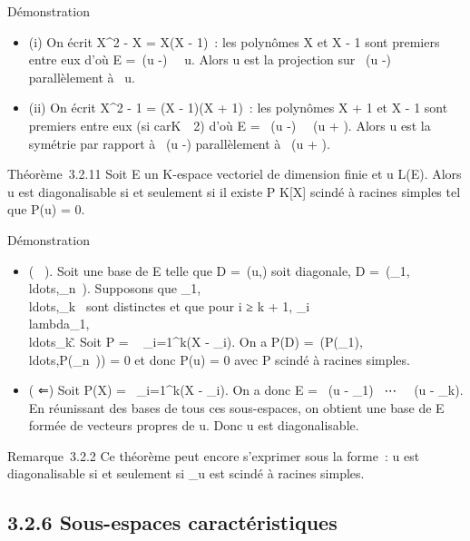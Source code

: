 \documentclass[]{article}
\begin{document}
Démonstration

\begin{itemize}
\itemsep1pt\parskip0pt
\item
  (i) On écrit X^2 - X = X(X - 1)~: les polynômes X et X - 1
  sont premiers entre eux d'où E =\
  \mathrmKer(u -\mathrmId)
  \oplus~\mathrmKer~u. Alors u est
  la projection sur
  \mathrmKer~(u
  -\mathrmId) parallèlement à
  \mathrmKer~u.
\item
  (ii) On écrit X^2 - 1 = (X - 1)(X + 1)~: les polynômes X +
  1 et X - 1 sont premiers entre eux (si
  carK\mathrel\neq~~2) d'où E
  = \mathrmKer~(u
  -\mathrmId)
  \oplus~\mathrmKer~(u +
  \mathrmId). Alors u est la symétrie par rapport à
  \mathrmKer~(u
  -\mathrmId) parallèlement à
  \mathrmKer~(u +
  \mathrmId).
\end{itemize}

Théorème~3.2.11 Soit E un K-espace vectoriel de dimension finie et u \in
L(E). Alors u est diagonalisable si et seulement si il existe P \in
K[X] scindé à racines simples tel que P(u) = 0.

Démonstration

\begin{itemize}
\itemsep1pt\parskip0pt
\item
  ( \rigtharrow~). Soit  une base de E telle que D =\
  \mathrmMat (u,) soit diagonale, D
  =\
  \mathrmdiag(\lambda_1,\\ldots,\lambda_n~).
  Supposons que
  \lambda_1,\\ldots,\lambda_k~
  sont distinctes et que pour i ≥ k + 1, \lambda_i
  \in\\lambda_1,\\ldots\lambda_k\~.
  Soit P = \∏ ~
  _i=1^k(X - \lambda_i). On a P(D)
  =\
  \mathrmdiag(P(\lambda_1),\\ldots,P(\lambda_n~))
  = 0 et donc P(u) = 0 avec P scindé à racines simples.
\item
  ( ⇐) Soit P(X) =\ \∏
   _i=1^k(X - \lambda_i). On a donc E
  = \mathrmKer~(u -
  \lambda_1\mathrmId)
  \oplus~⋯
  \oplus~\mathrmKer~(u -
  \lambda_k\mathrmId). En réunissant des bases de
  tous ces sous-espaces, on obtient une base de E formée de vecteurs
  propres de u. Donc u est diagonalisable.
\end{itemize}

Remarque~3.2.2 Ce théorème peut encore s'exprimer sous la forme~: u est
diagonalisable si et seulement si \mu_u est scindé à racines
simples.

\subsection{3.2.6 Sous-espaces caractéristiques}
\end{document}

